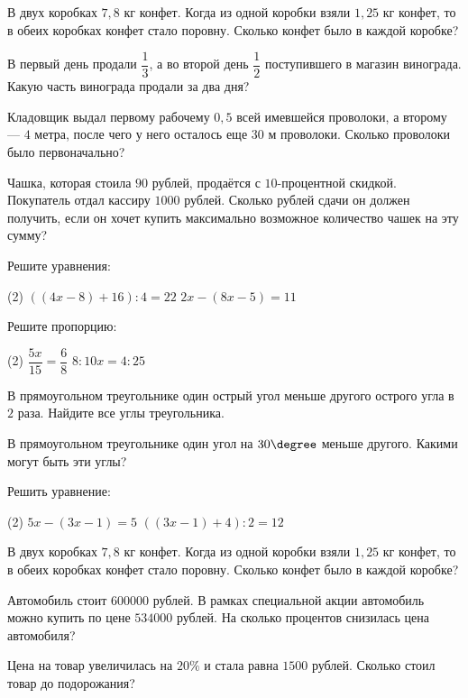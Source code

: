 \begin{class}[number=7]
	\begin{listofex}
		\item В двух коробках \(7,8\) кг конфет. Когда из одной коробки взяли \(1,25\) кг конфет, то в обеих коробках конфет стало поровну. Сколько конфет было в каждой коробке?
		\item В первый день продали \(\dfrac{1}{3}\), а во второй день \(\dfrac{1}{2}\) поступившего в магазин винограда. Какую часть винограда продали за два дня?
		\item Кладовщик выдал первому рабочему \(0,5\) всей имевшейся проволоки, а второму --- \(4\) метра, после чего у него осталось еще \(30\) м проволоки. Сколько проволоки было первоначально?
		\item Чашка, которая стоила \(90\) рублей, продаётся с \(10\)-процентной скидкой. Покупатель отдал кассиру \(1000\) рублей. Сколько рублей сдачи он должен получить, если он хочет купить максимально возможное количество чашек на эту сумму?
		\item Решите уравнения:
		\begin{tasks}(2)
			\task \( ((4x-8)+16):4=22\)
			\task \( 2x-(8x-5)=11 \)
		\end{tasks}
		\item Решите пропорцию:
		\begin{tasks}(2)
			\task \( \dfrac{5x}{15}=\dfrac{6}{8} \)
			\task \( 8:10x=4:25\)
		\end{tasks}
		\item В прямоугольном треугольнике один острый угол меньше другого острого угла в \( 2 \) раза. Найдите все углы треугольника.
		\item В прямоугольном треугольнике один угол на \( 30 \degree \) меньше другого. Какими могут быть эти углы?
	\end{listofex}
\end{class}

\begin{homework}[number=1]
	\begin{listofex}
		\item Решить уравнение:
		\begin{tasks}(2)
			\task \( 5x-(3x-1)=5 \)
			\task \( ((3x-1)+4):2=12\)
		\end{tasks}
		\item В двух коробках \(7,8\) кг конфет.
		Когда из одной коробки взяли \(1,25\) кг конфет, то в обеих коробках конфет стало поровну.
		Сколько конфет было в каждой коробке?
		\item Автомобиль стоит \(600000\) рублей.
		В рамках специальной акции автомобиль можно купить по цене \(534000\) рублей.
		На сколько процентов снизилась цена автомобиля?
		\item Цена на товар увеличилась на \(20\%\) и стала равна \(1500\) рублей.
		Сколько стоил товар до подорожания?
	\end{listofex}
\end{homework}

